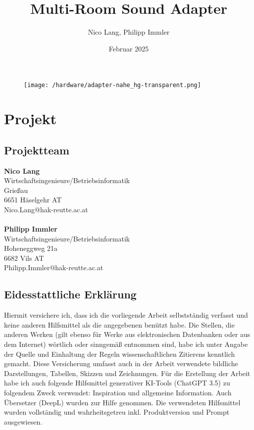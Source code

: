 \documentclass[]{article}
\title{\textbf{Multi-Room Sound Adapter}}
\author{Nico Lang, Philipp Immler}
\date{Februar 2025}
\begin{document}
\maketitle
\vspace{25mm}
\begin{figure}[H]
\begin{center}
\hspace*{-0.5cm}\texttt{[image: /hardware/adapter-nahe\_hg-transparent.png]}
\end{center}
\end{figure}
\thispagestyle{empty}

\pagebreak

\section{Projekt}
\subsection{Projektteam}
\textbf{Nico Lang}\\
Wirtschaftsingenieure/Betriebsinformatik\\
Grießau\\
6651 Häselgehr AT\\
Nico.Lang@hak-reutte.ac.at\\
\\
\textbf{Philipp Immler}\\
Wirtschaftsingenieure/Betriebsinformatik\\
Hoheneggweg 21a\\
6682 Vils AT\\
Philipp.Immler@hak-reutte.ac.at

\pagebreak

\subsection{Eidesstattliche Erklärung}
Hiermit versichere ich, dass ich die vorliegende Arbeit selbstständig verfasst und keine anderen Hilfsmittel als die angegebenen benützt habe. Die Stellen, die anderen Werken (gilt ebenso für Werke aus elektronischen Datenbanken oder aus dem Internet) wörtlich oder sinngemäß entnommen sind, habe ich unter Angabe der Quelle und Einhaltung der Regeln wissenschaftlichen Zitierens kenntlich gemacht. Diese Versicherung umfasst auch in der Arbeit verwendete bildliche Darstellungen, Tabellen, Skizzen und Zeichnungen. Für die Erstellung der Arbeit habe ich auch folgende Hilfsmittel generativer KI-Tools (ChatGPT 3.5) zu folgendem Zweck verwendet: Inspiration und allgemeine Information. Auch Übersetzer (DeepL) wurden zur Hilfe genommen. Die verwendeten Hilfsmittel wurden vollständig und wahrheitsgetreu inkl. Produktversion und Prompt ausgewiesen.\\
\end{document}
